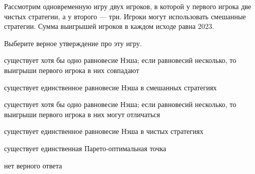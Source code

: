 
\begin{question}
Рассмотрим одновременную игру двух игроков, в которой у первого игрока две чистых стратегии, а у второго --- три. Игроки могут использовать смешанные стратегии.
Сумма выигрышей игроков в каждом исходе равна 2023.

Выберите верное утверждение про эту игру.
\begin{answerlist}
  \item существует хотя бы одно равновесие Нэша; если равновесий несколько, то выигрыши первого игрока в них совпадают
  \item существует единственное равновесие Нэша в смешанных стратегиях
  \item существует хотя бы одно равновесие Нэша; если равновесий несколько, то выигрыши первого игрока в них могут отличаться
  \item существует единственное равновесие Нэша в чистых стратегиях
  \item существует единственная Парето-оптимальная точка
  \item нет верного ответа
\end{answerlist}
\end{question}


